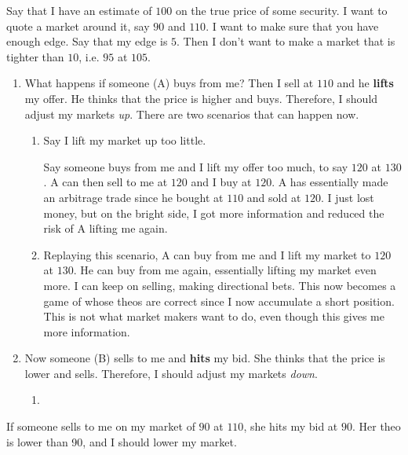 \documentclass{article}
\begin{document}
    Say that I have an estimate of $100$ on the true price of some security. I want to quote a market around it, say $90$ and $110$. I want to make sure that you have enough edge. Say that my edge is $5$. Then I don't want to make a market that is tighter than $10$, i.e. $95$ at $105$.
    \begin{enumerate}
      \item What happens if someone (A) buys from me? Then I sell at $110$ and he \textbf{lifts} my offer. He thinks that the price is higher and buys. Therefore, I should adjust my markets \textit{up}. There are two scenarios that can happen now. 

        \begin{enumerate}
          \item Say I lift my market up too little. 

            Say someone buys from me and I lift my offer too much, to say $120$ at $130$. A can then sell to me at $120$ and I buy at $120$. A has essentially made an arbitrage trade since he bought at $110$ and sold at $120$. I just lost money, but on the bright side, I got more information and reduced the risk of A lifting me again.

          \item Replaying this scenario, A can buy from me and I lift my market to $120$ at $130$. He can buy from me again, essentially lifting my market even more. I can keep on selling, making directional bets. This now becomes a game of whose theos are correct since I now accumulate a short position. This is not what market makers want to do, even though this gives me more information.
        \end{enumerate}

      \item Now someone (B) sells to me and \textbf{hits} my bid. She thinks that the price is lower and sells. Therefore, I should adjust my markets \textit{down}.

        \begin{enumerate}
          \item 
        \end{enumerate}
    \end{enumerate}

    If someone sells to me on my market of $90$ at $110$, she hits my bid at $90$. Her theo is lower than 90, and I should lower my market.
\end{document}
